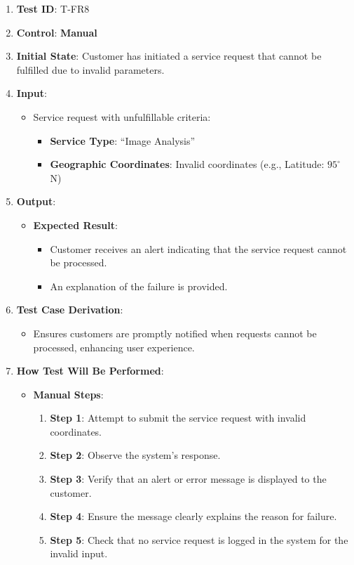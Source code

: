 \documentclass[12pt, titlepage]{article}
\begin{document}
\begin{enumerate}
    \item \textbf{Test ID}: T-FR8
    \item \textbf{Control}: \textbf{Manual}
    \item \textbf{Initial State}: Customer has initiated a service request that cannot be fulfilled due to invalid parameters.
    \item \textbf{Input}:
    \begin{itemize}
        \item Service request with unfulfillable criteria:
        \begin{itemize}
            \item \textbf{Service Type}: ``Image Analysis''
            \item \textbf{Geographic Coordinates}: Invalid coordinates (e.g., Latitude: $95^\circ$ N)
        \end{itemize}
    \end{itemize}
    \item \textbf{Output}:
    \begin{itemize}
        \item \textbf{Expected Result}:
        \begin{itemize}
            \item Customer receives an alert indicating that the service request cannot be processed.
            \item An explanation of the failure is provided.
        \end{itemize}
    \end{itemize}
    \item \textbf{Test Case Derivation}:
    \begin{itemize}
        \item Ensures customers are promptly notified when requests cannot be processed, enhancing user experience.
    \end{itemize}
    \item \textbf{How Test Will Be Performed}:
    \begin{itemize}
        \item \textbf{Manual Steps}:
        \begin{enumerate}
            \item \textbf{Step 1}: Attempt to submit the service request with invalid coordinates.
            \item \textbf{Step 2}: Observe the system's response.
            \item \textbf{Step 3}: Verify that an alert or error message is displayed to the customer.
            \item \textbf{Step 4}: Ensure the message clearly explains the reason for failure.
            \item \textbf{Step 5}: Check that no service request is logged in the system for the invalid input.
        \end{enumerate}
    \end{itemize}
\end{enumerate}
\end{document}
